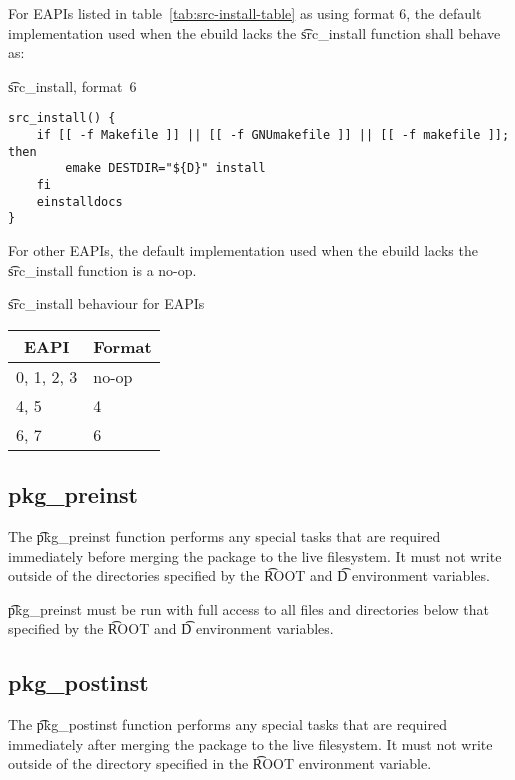  For EAPIs listed in table~\ref{tab:src-install-table} as using format
6, the default implementation used when the ebuild lacks the \t{src_install} function shall behave
as:

\begin{listing}[H]
\caption{\t{src_install}, format~6}
\begin{verbatim}
src_install() {
    if [[ -f Makefile ]] || [[ -f GNUmakefile ]] || [[ -f makefile ]]; then
        emake DESTDIR="${D}" install
    fi
    einstalldocs
}
\end{verbatim}
\end{listing}

For other EAPIs, the default implementation used when the ebuild lacks the \t{src_install} function
is a no-op.

\begin{centertable}{\t{src_install} behaviour for EAPIs}
    \label{tab:src-install-table}
    \begin{tabular}{ll}
      \toprule
      \multicolumn{1}{c}{\textbf{EAPI}} &
      \multicolumn{1}{c}{\textbf{Format}} \\
      \midrule
      0, 1, 2, 3        & no-op \\
      4, 5              & 4     \\
      6, 7              & 6     \\
      \bottomrule
    \end{tabular}
\end{centertable}

\subsection{pkg_preinst}

The \t{pkg_preinst} function performs any special tasks that are required immediately before
merging the package to the live filesystem. It must not write outside of the directories specified
by the \t{ROOT} and \t{D} environment variables.

\t{pkg_preinst} must be run with full access to all files and directories below that specified by
the \t{ROOT} and \t{D} environment variables.

\subsection{pkg_postinst}

The \t{pkg_postinst} function performs any special tasks that are required immediately after
merging the package to the live filesystem. It must not write outside of the directory specified
in the \t{ROOT} environment variable.

